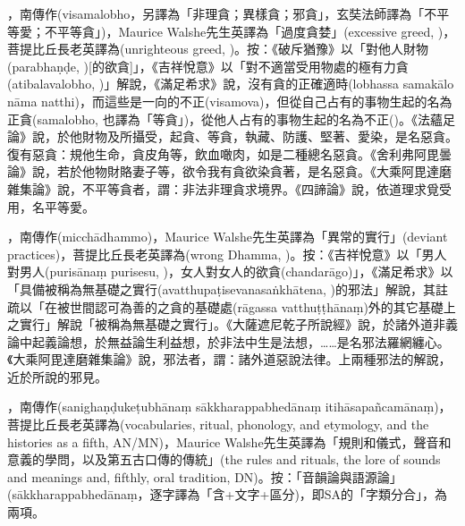 \startitemgroup[noteitems]
\item{}，南傳作(visamalobho，另譯為「非理貪；異樣貪；邪貪」，玄奘法師譯為「不平等愛；不平等貪」)，Maurice Walshe先生英譯為「過度貪婪」(excessive greed, )，菩提比丘長老英譯為(unrighteous greed, )。按：《破斥猶豫》以「對他人財物(parabhaṇḍe, )[的欲貪]」，《吉祥悅意》以「對不適當受用物處的極有力貪(atibalavalobho, )」解說，《滿足希求》說，沒有貪的正確適時(lobhassa samakālo nāma natthi)，而這些是一向的不正(visamova)，但從自己占有的事物生起的名為正貪(samalobho, 也譯為「等貪」)，從他人占有的事物生起的名為不正()。《法蘊足論》說，於他財物及所攝受，起貪、等貪，執藏、防護、堅著、愛染，是名惡貪。復有惡貪：規他生命，貪皮角等，飲血噉肉，如是二種總名惡貪。《舍利弗阿毘曇論》說，若於他物財賂妻子等，欲令我有貪欲染貪著，是名惡貪。《大乘阿毘達磨雜集論》說，不平等貪者，謂：非法非理貪求境界。《四諦論》說，依道理求覓受用，名平等愛。
\stopitemgroup

\startitemgroup[noteitems]
\item{}，南傳作(micchādhammo)，Maurice Walshe先生英譯為「異常的實行」(deviant practices)，菩提比丘長老英譯為(wrong Dhamma, )。按：《吉祥悅意》以「男人對男人(purisānaṃ purisesu, )，女人對女人的欲貪(chandarāgo)」，《滿足希求》以「具備被稱為無基礎之實行(avatthupaṭisevanasaṅkhātena, )的邪法」解說，其註疏以「在被世間認可為善的之貪的基礎處(rāgassa vatthuṭṭhānaṃ)外的其它基礎上之實行」解說「被稱為無基礎之實行」。《大薩遮尼乾子所說經》說，於諸外道非義論中起義論想，於無益論生利益想，於非法中生是法想，……是名邪法羅網纏心。《大乘阿毘達磨雜集論》說，邪法者，謂：諸外道惡說法律。上兩種邪法的解說，近於所說的邪見。
\stopitemgroup

\startitemgroup[noteitems]
\item{}，南傳作(sanighaṇḍukeṭubhānaṃ sākkharappabhedānaṃ itihāsapañcamānaṃ)，菩提比丘長老英譯為(vocabularies, ritual, phonology, and etymology, and the histories as a fifth, AN/MN)，Maurice Walshe先生英譯為「規則和儀式，聲音和意義的學問，以及第五古口傳的傳統」(the rules and rituals, the lore of sounds and meanings and, fifthly, oral tradition, DN)。按：「音韻論與語源論」(sākkharappabhedānaṃ，逐字譯為「含+文字+區分)，即SA的「字類分合」，為兩項。
\stopitemgroup

